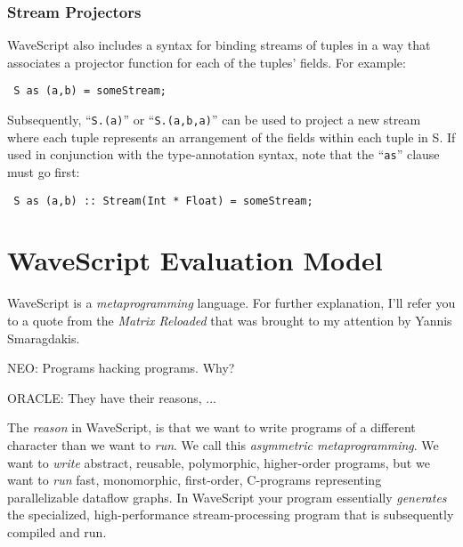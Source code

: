 \documentclass[twocolumn]{report}
\newenvironment{wscode}{\begin{center}\tt}{\end{center}}
\begin{document}
\subsection{Stream Projectors}

WaveScript also includes a syntax for binding streams of tuples in a
 way that associates a projector function for each of
the tuples' fields.  For example:

\begin{wscode}
S as (a,b) = someStream;
\end{wscode}

Subsequently, ``{\tt S.(a)}'' or ``{\tt S.(a,b,a)}'' can be used to
project a new stream where each tuple represents an arrangement of
the fields within each tuple in {S}.  If used in conjunction with the
type-annotation syntax, note that the ``{\tt as}'' clause must go first:

\begin{wscode}
S as (a,b) :: Stream(Int * Float) = someStream;
\end{wscode}






\chapter{WaveScript Evaluation Model}

WaveScript is a {\em metaprogramming} language.  For further
explanation, I'll refer you to a quote from the {\em Matrix Reloaded}
that was brought to my attention by Yannis Smaragdakis.

\begin{center}
NEO: Programs hacking programs. Why?

ORACLE: They have their reasons, ...
\end{center}

The {\em reason} in WaveScript, is that we want to write programs of a
different character than we want to {\em run}.  We call this {\em asymmetric metaprogramming}.
We want to {\em write}
abstract, reusable, polymorphic, higher-order programs, but we want to
{\em run} fast, monomorphic, first-order, C-programs representing
parallelizable dataflow graphs.
In WaveScript your program essentially {\em
generates} the specialized, high-performance stream-processing
program that is subsequently compiled and run.  
\end{document}
